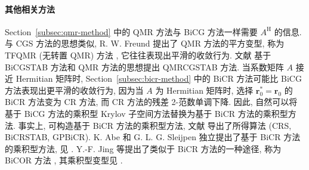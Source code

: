 \paragraph{{其他相关方法}}\label{subsec:product-related-methods}\mbox{}\par
{Section\ \ref{subsec:qmr-method} 中的 QMR 方法与 BiCG 方法一样需要 $A^{\mathrm H}$ 的信息. 与 CGS 方法的思想类似, R. W. Freund 提出了 QMR 方法的平方变型, 称为 TFQMR (无转置 QMR) 方法 , 它往往表现出平滑的收敛行为. 文献  基于 BiCGSTAB 方法和 QMR 方法的思想提出 QMRCGSTAB 方法.}
{当系数矩阵 $A$ 接近 Hermitian 矩阵时, Section\ \ref{subsec:bicr-method} 中的 BiCR 方法可能比 BiCG 方法表现出更平滑的收敛行为, 因为当 $A$ 为 Hermitian 矩阵时, 选择 $\bm r_0^{*}=\bm r_0$ 的 BiCR 方法变为 CR 方法, 而 CR 方法的残差 2-范数单调下降. 因此, 自然可以将基于 BiCG 方法的乘积型 Krylov 子空间方法替换为基于 BiCR 方法的乘积型方法. 事实上, 可构造基于 BiCR 方法的乘积型方法, 文献  导出了所得算法 (CRS, BiCRSTAB, GPBiCR). K. Abe 和 G. L. G. Sleijpen 独立提出了基于 BiCR 方法的乘积型方法, 见 .}
{Y.-F. Jing 等提出了类似于 BiCR 方法的一种途径, 称为 BiCOR 方法 , 其乘积型变型见 .}

